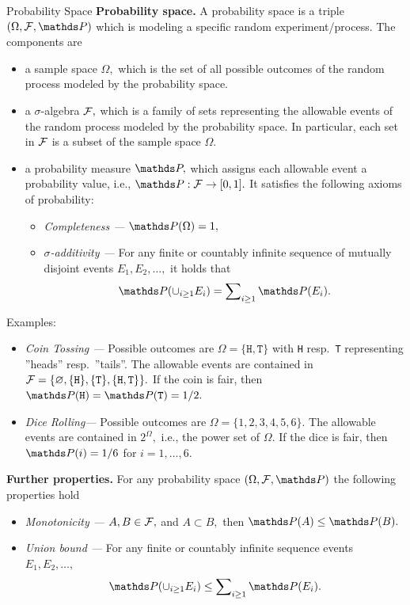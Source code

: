\documentclass[11pt,compress,t,notes=noshow, xcolor=table]{beamer}
\begin{document}
\begin{vbframe}{Probability Space}
	\textbf{Probability space.} A probability space is a triple $(\Omega,\F,\P)$ which is modeling a specific random experiment/process.
		The components are
		\begin{itemize}
			\item a sample space $\Omega,$ which is the set of all possible outcomes of the random process modeled by the probability space.
			\item a $\sigma$-algebra $\mathcal{F},$ which is a family of sets representing the allowable events of the random process modeled by the probability space.
			In particular, each set in $\mathcal{F}$ is a subset of the sample space $\Omega.$
			\item a probability measure $\P,$ which assigns each allowable event a probability value, i.e., $\P:\F\to[0,1].$ It satisfies the following axioms of probability:
			\begin{itemize}
				\item  \emph{Completeness ---} $\P(\Omega)=1,$  
				\item  \emph{$\sigma$-additivity ---} For any finite or countably infinite sequence of mutually disjoint events $E_1,E_2,\ldots,$ it holds that
				$$\P(\cup_{i\geq1}  E_i) = \sum\nolimits_{i\geq 1} \P(E_i).$$
			\end{itemize}
		\end{itemize}
		\framebreak
		Examples:
		\begin{itemize}
			\item \emph{Coin Tossing ---} Possible outcomes are $\Omega=\{\texttt{H},\texttt{T} \}$ with \texttt{H} resp.\ \texttt{T} representing ''heads'' resp.\ ''tails''. The allowable events are contained in $\mathcal{F}=\{\varnothing,  \{\texttt{H}\} , \{\texttt{T}\}, \{\texttt{H},\texttt{T}\}  \}.$ If the coin is fair, then $\P(\texttt{H})=\P(\texttt{T})=1/2.$
			\item \emph{Dice Rolling---} Possible outcomes are $\Omega=\{1,2,3,4,5,6\}.$  The allowable events are contained in $2^\Omega,$ i.e., the power set of $\Omega.$
			If the dice is fair, then $\P(i)=1/6$ for $i=1,\ldots,6.$
		\end{itemize}
		\textbf{Further properties.} For any probability space $(\Omega,\F,\P)$ the following properties hold
		\begin{itemize}
			\item \emph{Monotonicity ---} $A,B\in \mathcal{F},$ and $A\subset B,$ then $\P(A)\leq \P(B).$
			\item \emph{Union bound ---}  For any finite or countably infinite sequence events $E_1,E_2,\ldots,$ 
			$$\P(\cup_{i\geq1}  E_i) \leq \sum\nolimits_{i\geq 1} \P(E_i).$$
		\end{itemize}

\end{vbframe}
\end{document}
